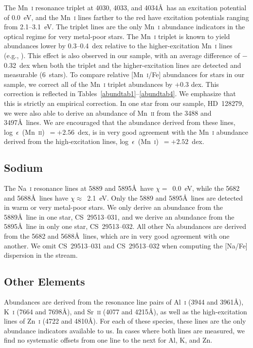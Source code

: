 \documentclass{emulateapj}
\begin{document}
The Mn~\textsc{i} resonance triplet at 4030, 4033, and 4034\AA\ 
has an excitation potential of 0.0~eV, and
the Mn~\textsc{i} lines farther to the red
have excitation potentials ranging from 2.1--3.1~eV.
The triplet lines are the only Mn~\textsc{i}
abundance indicators in the optical regime for very metal-poor stars.
The Mn~\textsc{i} triplet is known to yield abundances
lower by 0.3--0.4~dex relative to the higher-excitation Mn~\textsc{i} lines
(e.g., \citealt{cayrel04}).
This effect is also observed in our sample, with an average difference of 
$-$0.32~dex when both the triplet and the higher-excitation lines
are detected and measurable (6~stars).
To compare relative [Mn~\textsc{i}/Fe] abundances for stars in our sample,
we correct all of the Mn~\textsc{i} triplet abundances by $+$0.3 dex.
This correction is reflected in Tables~\ref{abundtab1}--\ref{abundtab4}.
We emphasize that this is strictly an empirical correction.
In one star from our sample, \mbox{HD~128279}, we were also able to derive
an abundance of Mn~\textsc{ii} from the 3488 and 3497\AA\ lines.
We are encouraged that
the abundance derived from these lines, 
log~$\epsilon$~(Mn~\textsc{ii})~$= +2.56$~dex,
is in very good agreement with the Mn~\textsc{i} abundance derived from
the high-excitation lines, log~$\epsilon$~(Mn~\textsc{i})~$= +2.52$~dex.


\subsection{Sodium}


The Na~\textsc{i} resonance lines at 
5889 and 5895\AA\ have $\chi =$~0.0~eV, while the 5682 and 5688\AA\ lines
have $\chi \approx$~2.1~eV.
Only the 5889 and 5895\AA\ lines are detected in warm or very
metal-poor stars.
We only derive an abundance from the 5889\AA\ line in one star,
\mbox{CS~29513--031}, and we derive an abundance from the
5895\AA\ line in only one star, \mbox{CS~29513--032}.
All other Na abundances are derived from the 5682 and 5688\AA\ lines, 
which are in very good agreement with one another.
We omit \mbox{CS~29513--031} and \mbox{CS~29513--032} when 
computing the [Na/Fe] dispersion in the stream.


\subsection{Other Elements}


Abundances are derived from the resonance line pairs of 
Al~\textsc{i} (3944 and 3961\AA),
K~\textsc{i} (7664 and 7698\AA), and
Sr~\textsc{ii} (4077 and 4215\AA), as well as
the high-excitation lines of Zn~\textsc{i} (4722 and 4810\AA).
For each of these species, these lines are the only abundance 
indicators available to us.
In cases where both lines are measured, we find no systematic offsets
from one line to the next for Al, K, and Zn.  
\end{document}
